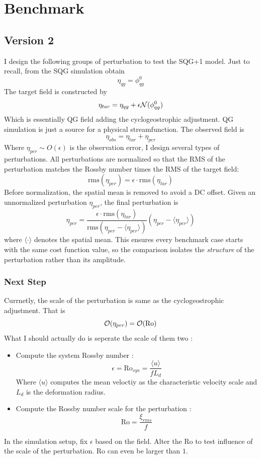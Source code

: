 \documentclass[../SQG_notes.tex]{subfiles}
\begin{document}
    \section{Benchmark}

    \subsection{Version 2}
    I design the following groups of perturbation to test the SQG+1 model. Just to recall, from the SQG simulation obtain 
    \[ \eta_{qg} = \phi^0_{qg}\]
    The target field is constructed by 
    \[ \eta_{tar} = \eta_{qg} + \epsilon\mathcal{N}(\phi^0_{qg})\]
    Which is essentially QG field adding the cyclogeostrophic adjustment. QG simulation is just a source for a physical streamfunction. The observed field is 
    \[ \eta_{obs} = \eta_{tar} + \eta_{per}\]
    Where $\eta_{per} \sim O(\epsilon)$ is the observation error, I design several types of perturbations.
    All perturbations are normalized so that the RMS of the perturbation matches the Rossby number times the RMS of the target field:
    \[ \text{rms}(\eta_{per}) = \epsilon \cdot \text{rms}(\eta_{tar}) \]
    Before normalization, the spatial mean is removed to avoid a DC offset. Given an unnormalized perturbation $\eta_{per}$, the final perturbation is
    \[ \eta_{per} = \frac{\epsilon \cdot \text{rms}(\eta_{tar})}{\text{rms}(\eta_{per} - \langle \eta_{per} \rangle)} \left(\eta_{per} - \langle \eta_{per} \rangle \right) \]
    where $\langle \cdot \rangle$ denotes the spatial mean. This ensures every benchmark case starts with the same cost function value, so the comparison isolates the \emph{structure} of the perturbation rather than its amplitude.

    \subsubsection*{Next Step}
    Currnetly, the scale of the perturbation is same as the cyclogeostrophic adjustment. That is 
    \[ \mathcal{O}(\eta_{per}) = \mathcal{O}(\text{Ro})\]
    What I should actually do is seperate the scale of them two : 
    \begin{itemize}
        \item Compute the system Rossby number : 
        \[ \epsilon = \text{Ro}_{sys} = \frac{\langle u \rangle}{f L_d}\]
        Where $\langle u \rangle$ computes the mean veloctiy as the characteristic velocity scale and $L_d$ is the deformation radius.
        \item Compute the Rossby number scale for the perturbation : 
        \[ \text{Ro} = \frac{\xi_{rms}}{f}\]
    \end{itemize}
    In the simulation setup, fix $\epsilon$ based on the field. Alter the $\text{Ro}$ to test influence of the scale of the perturbation. $\text{Ro}$ can even be larger than $1$. 
\end{document}
